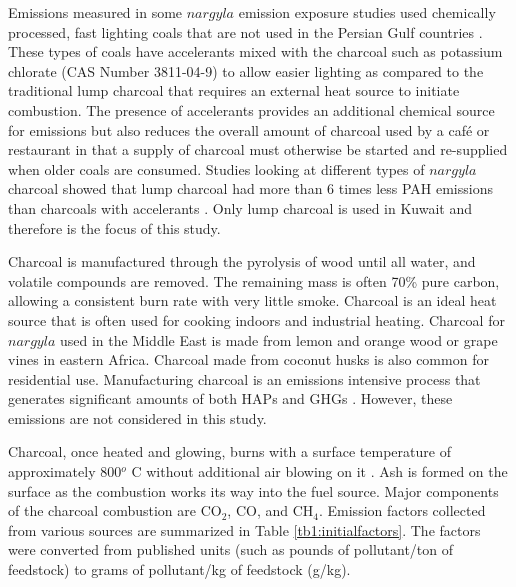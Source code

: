 Emissions measured in some $nargyla$ emission exposure studies used chemically processed, fast lighting coals that are not used in the Persian Gulf countries \citep{Daher2010, Shihadeh2005}.  These types of coals have accelerants mixed with the charcoal such as potassium chlorate (CAS Number 3811-04-9) \citep{MIC2012} to allow easier lighting as compared to the traditional lump charcoal that requires an external heat source to initiate combustion.  The presence of accelerants provides an additional chemical source for emissions but also reduces the overall amount of charcoal used by a caf\'e or restaurant in that a supply of charcoal must otherwise be started and re-supplied when older coals are consumed. Studies looking at different types of $nargyla$ charcoal showed that lump charcoal had more than 6 times less PAH emissions than charcoals with accelerants \citep{Sepetdjian2010}.  Only lump charcoal is used in Kuwait and therefore is the focus of this study.

Charcoal is manufactured through the pyrolysis of wood until all water, and volatile compounds are removed.  The remaining mass is often 70\% pure carbon, allowing a consistent burn rate with very little smoke. Charcoal is an ideal heat source that is often used for cooking indoors and industrial heating.  Charcoal for $nargyla$ used in the Middle East is made from lemon and orange wood or grape vines in eastern Africa.  Charcoal made from coconut husks is also common for residential use.  Manufacturing charcoal is an emissions intensive process that generates significant amounts of both HAPs and GHGs \citep{Lacaux1994}.  However, these emissions are not considered in this study.

Charcoal, once heated and glowing, burns with a surface temperature of approximately 800$^{o}$ C without additional air blowing on it \citep{Evans1977}.  Ash is formed on the surface as the combustion works its way into the fuel source. Major components of the charcoal combustion are CO$_{2}$, CO, and CH$_{4}$.  Emission factors collected from various sources are summarized in Table \ref{tb1:initialfactors}.  The factors were converted from published units (such as pounds of pollutant/ton of feedstock) to grams of pollutant/kg of feedstock (g/kg).

